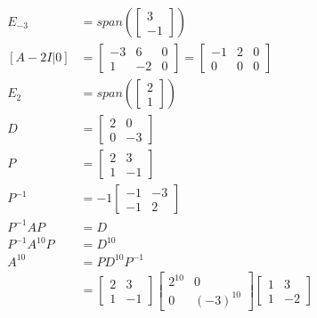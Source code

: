 \documentclass{math}
\begin{document}
\begin{align*}
  E_{-3} &= span\left(\begin{bmatrix}3 \\ -1\end{bmatrix}\right) \\
  [A-2I|0] &= \begin{bmatrix}
    -3 & 6 & 0 \\
    1 & -2 & 0
  \end{bmatrix} = \begin{bmatrix}
    -1 & 2 & 0 \\
    0 & 0 & 0
  \end{bmatrix} \\
  E_2 &= span\left(\begin{bmatrix}2 \\ 1\end{bmatrix}\right) \\
  D &= \begin{bmatrix}2 & 0 \\ 0 & -3\end{bmatrix} \\
  P &= \begin{bmatrix}2 & 3 \\ 1 & -1\end{bmatrix} \\
  P^{-1} &= -1\begin{bmatrix}-1 & -3 \\ -1 & 2\end{bmatrix} \\
  P^{-1}AP &= D \\
  P^{-1}A^{10}P &= D^{10} \\
  A^{10} &= PD^{10}P^{-1} \\
  &= \begin{bmatrix}2 & 3 \\ 1 & -1\end{bmatrix}
    \begin{bmatrix}2^{10} & 0 \\ 0 & (-3)^{10}\end{bmatrix}
    \begin{bmatrix}1 & 3 \\ 1 & -2\end{bmatrix}
\end{align*}
\end{document}
